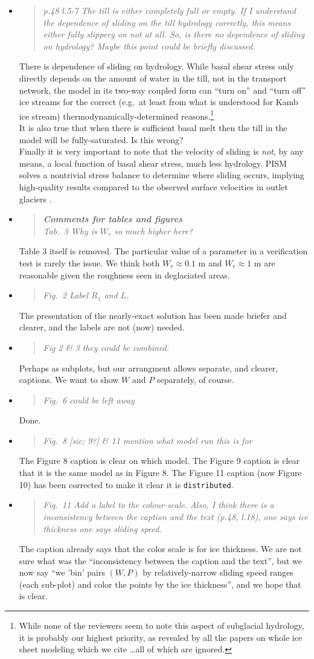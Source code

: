 \documentclass[11pt,reqno]{amsart}
\newcommand{\reply}[2]{
\medskip\medskip
\item  \begin{quote}
\emph{#1}
\end{quote}

\medskip
\noindent #2}
\begin{document}
\begin{itemize}
\reply{p.48 l.5-7 The till is either completely full or empty.  If I understand the dependence of sliding on the till hydrology correctly, this means either fully slippery on not at all.  So, is there no dependence of sliding on hydrology?  Maybe this point could be briefly discussed.}
{There is dependence of sliding on hydrology.  While basal shear stress only directly depends on the amount of water in the till, not in the transport network, the model in its two-way coupled form can ``turn on'' and ``turn off'' ice streams for the correct (e.g.~at least from what is understood for Kamb ice stream) thermodynamically-determined reasons.\footnote{While none of the reviewers seem to note this aspect of subglacial hydrology, it is probably our highest priority, as revealed by all the papers on whole ice sheet modeling which we cite \dots all of which are ignored.} \\
\indent It is also true that when there is sufficient basal melt then the till in the model will be fully-saturated.  Is this wrong? \\
\indent Finally it is very important to note that the velocity of sliding is \emph{not}, by any means, a local function of basal shear stress, much less hydrology.  PISM solves a nontrivial stress balance to determine where sliding occurs, implying high-quality results compared to the observed surface velocities in outlet glaciers \cite{AschwandenAdalgeirsdottirKhroulev}.}

\reply{\textbf{Comments for tables and figures}\\
Tab.~3 Why is $W_r$ so much higher here?}
{Table 3 itself is removed.  The particular value of a parameter in a verification test is rarely the issue.  We think both $W_r\approx 0.1$ m and $W_r\approx 1$ m are reasonable given the roughness seen in deglaciated areas.}

\reply{Fig.~2 Label $R_1$ and $L$.}
{The presentation of the nearly-exact solution has been made briefer and clearer, and the labels are not (now) needed.}

\reply{Fig 2 \& 3 they could be combined.}
{Perhaps as subplots, but our arrangment allows separate, and clearer, captions.  We want to show $W$ and $P$ separately, of course.}

\reply{Fig.~6 could be left away}
{Done.}

\reply{Fig.~8 [sic; 9?] \& 11 mention what model run this is for}
{The Figure 8 caption is clear on which model.  The Figure 9 caption is clear that it is the same model as in Figure 8.  The Figure 11 caption (now Figure 10) has been corrected to make it clear it is \texttt{distributed}.}

\reply{Fig.~11 Add a label to the colour-scale. Also, I think there is a inconsistency between the caption and the text (p.48, l.18), one says ice thickness one says sliding speed.}
{The caption already says that the color scale is for ice thickness.  We are not sure what was the ``inconsistency between the caption and the text'', but we now say ``we 'bin' pairs $(W,P)$ by relatively-narrow sliding speed ranges (each sub-plot) and color the points by the ice thickness'', and we hope that is clear.}
\end{itemize}
\end{document}
